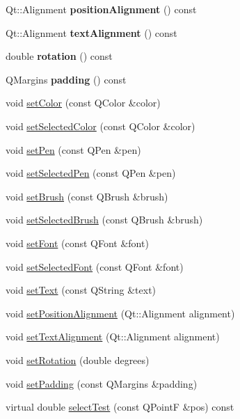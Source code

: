 \begin{DoxyCompactItemize}
\item 
\hypertarget{classQCPItemText_af13c6adc480f268116ae72196eb44b06}{Qt\-::\-Alignment {\bfseries position\-Alignment} () const }\label{classQCPItemText_af13c6adc480f268116ae72196eb44b06}

\item 
\hypertarget{classQCPItemText_aaa1d84b3f61f9f2a0cce230e66ef7194}{Qt\-::\-Alignment {\bfseries text\-Alignment} () const }\label{classQCPItemText_aaa1d84b3f61f9f2a0cce230e66ef7194}

\item 
\hypertarget{classQCPItemText_ae8991207fa1697511c1c8af9f3ca0e0a}{double {\bfseries rotation} () const }\label{classQCPItemText_ae8991207fa1697511c1c8af9f3ca0e0a}

\item 
\hypertarget{classQCPItemText_a00e0fa03822ff384bf4921c1c90322ff}{Q\-Margins {\bfseries padding} () const }\label{classQCPItemText_a00e0fa03822ff384bf4921c1c90322ff}

\item 
void \hyperlink{classQCPItemText_aa51efc0841fe52da9eaf8aff6fc8a8b2}{set\-Color} (const Q\-Color \&color)
\item 
void \hyperlink{classQCPItemText_ae7ba0bdb75c897b028388e45bfd435fa}{set\-Selected\-Color} (const Q\-Color \&color)
\item 
void \hyperlink{classQCPItemText_a9b9ec6eea0eb0603977ff84d4c78d0a3}{set\-Pen} (const Q\-Pen \&pen)
\item 
void \hyperlink{classQCPItemText_a291febe586f0da3f1c392e77bef4aa20}{set\-Selected\-Pen} (const Q\-Pen \&pen)
\item 
void \hyperlink{classQCPItemText_a1c7e131516df2ed8d941ef31240ded8e}{set\-Brush} (const Q\-Brush \&brush)
\item 
void \hyperlink{classQCPItemText_a6b8377eeb2af75eb9528422671ac16cb}{set\-Selected\-Brush} (const Q\-Brush \&brush)
\item 
void \hyperlink{classQCPItemText_a94ad60ebe04f5c07c35e7c2029e96b1f}{set\-Font} (const Q\-Font \&font)
\item 
void \hyperlink{classQCPItemText_a0be2841772f83663c4db307928b82816}{set\-Selected\-Font} (const Q\-Font \&font)
\item 
void \hyperlink{classQCPItemText_a3dacdda0ac88f99a05b333b977c48747}{set\-Text} (const Q\-String \&text)
\item 
void \hyperlink{classQCPItemText_a781cdf8c640fc6a055dcff1e675c8c7a}{set\-Position\-Alignment} (Qt\-::\-Alignment alignment)
\item 
void \hyperlink{classQCPItemText_ab5bc0684c4d1bed81949a11b34dba478}{set\-Text\-Alignment} (Qt\-::\-Alignment alignment)
\item 
void \hyperlink{classQCPItemText_a4bcc10cd97952c3f749d75824b5077f0}{set\-Rotation} (double degrees)
\item 
void \hyperlink{classQCPItemText_aeea8a3e01f135f9dd0bb08f51db66310}{set\-Padding} (const Q\-Margins \&padding)
\item 
virtual double \hyperlink{classQCPItemText_a01daa9ff25ec84a738ae05f59af99f4a}{select\-Test} (const Q\-Point\-F \&pos) const 
\end{DoxyCompactItemize}
